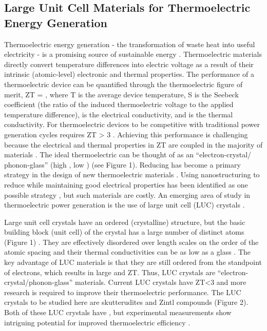 \documentclass[letterpaper,12pt]{article}
\begin{document}
\subsection{\label{S-Intro-Motivation}Large Unit Cell Materials for Thermoelectric Energy Generation}

Thermoelectric energy generation - the transformation of waste heat into useful electricity - is a promising source of sustainable energy \cite{ADMA:ADMA200600527}. Thermoelectric materials directly convert temperature differences into electric voltage as a result of their intrinsic (atomic-level) electronic and thermal properties. The performance of a thermoelectric device can be quantified through the thermoelectric figure of merit, ZT = , where T is the average device temperature, S is the Seebeck coefficient (the ratio of the induced thermoelectric voltage to the applied temperature difference),  is the electrical conductivity, and  is the thermal conductivity.  For thermoelectric devices to be competitive with traditional power generation cycles requires ZT > 3 \cite{Chen_Dresselhaus_Dresselhaus_Fleurial_Caillat_2003}. Achieving this performance is challenging because the electrical and thermal properties in ZT are coupled in the majority of materials \cite{ADMA:ADMA200600527,Chen_Dresselhaus_Dresselhaus_Fleurial_Caillat_2003}. The ideal thermoelectric can be thought of as an “electron-crystal/ phonon-glass” (high , low ) (see Figure 1). Reducing  has become a primary strategy in the design of new thermoelectric materials \cite{ADMA:ADMA200600527}.  Using nanostructuring to reduce  while maintaining good electrical properties has been identified as one possible strategy \cite{B822664B}, but such materials are costly. An emerging area of study in thermoelectric power generation is the use of large unit cell (LUC) crystals \cite{ADMA:ADMA200600527}.

 Large unit cell crystals have an ordered (crystalline) structure, but the basic building block (unit cell) of the crystal has a large number of distinct atoms (Figure 1) \cite{cm052055b,Yang_Chen_2006,wang_232107}.  They are effectively disordered over length scales on the order of the atomic spacing and their thermal conductivities can be as low as a glass \cite{cm052055b,Yang_Chen_2006,wang_232107}. The key advantage of LUC materials is that they are still ordered from the standpoint of electrons, which results in large  and ZT. Thus, LUC crystals are “electron-crystal/phonon-glass” materials. Current LUC crystals have ZT<3 \cite{cm052055b,Yang_Chen_2006,wang_232107} and more research is required to improve their thermoelectric performance. 
The LUC crystals to be studied here are skutterudites \cite{cm052055b} and Zintl compounds \cite{wang_232107} (Figure 2). Both of these LUC crystals have , but experimental measurements show intriguing potential for improved thermoelectric efficiency \cite{cm052055b,Yang_Chen_2006,wang_232107}.  
\end{document}
